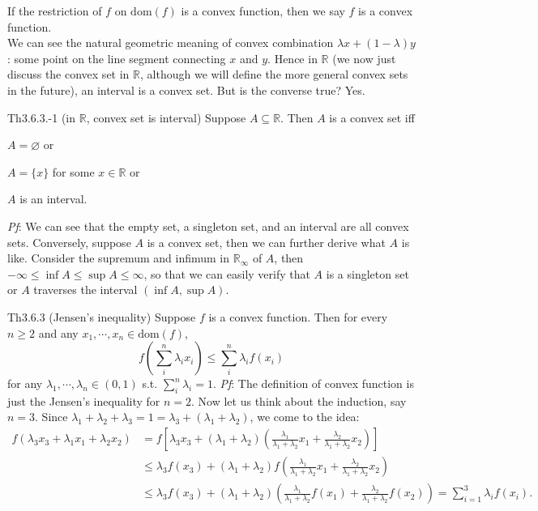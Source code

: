 \documentclass{article}
\begin{document}
\begin{Rmk}{}
    \textcolor{Df}{If the restriction of $f$ on $\text{dom}(f)$ is a convex function, then we say $f$ is a convex function.}\\
    We can see the natural geometric meaning of convex combination $\lambda x+(1-\lambda)y$: some point on the line segment connecting $x$ and $y$. Hence in $\mathbb{R}$ (we now just discuss the convex set in $\mathbb{R}$, although we will define the more general convex sets in the future), an interval is a convex set. But is the converse true? Yes.
\end{Rmk}

\begin{Th}{Th3.6.3.-1 (in $\mathbb{R}$, convex set is interval)}
    Suppose $A\subseteq \mathbb{R}$. Then $A$ is a convex set iff
    \begin{compactenum}
        \item $A=\varnothing$ or
        \item $A=\{x\}$ for some $x\in\mathbb{R}$ or
        \item $A$ is an interval.
    \end{compactenum}
    \tcblower
    \textit{Pf}: We can see that the empty set, a singleton set, and an interval are all convex sets. Conversely, suppose $A$ is a convex set, then we can further derive what $A$ is like. Consider the supremum and infimum in $\mathbb{R}_\infty$ of $A$, then $-\infty\leq\inf A \leq\sup A\leq\infty$, so that we can easily verify that $A$ is a singleton set or $A$ traverses the interval $(\inf A, \sup A)$.
\end{Th}

\begin{Th}{Th3.6.3 (Jensen's inequality)}
    Suppose $f$ is a convex function. Then for every $n\geq 2$ and any $x_1, \cdots, x_n\in\text{dom}(f)$, 
    $$ f\left(\sum_{i}^{n}\lambda_i x_i\right) \leq \sum_{i}^{n}\lambda_i f(x_i) $$
    for any $\lambda_1, \cdots, \lambda_n\in (0,1)$ s.t. $\sum_{i}^{n}\lambda_i = 1$.
    \tcblower
    \textit{Pf}: The definition of convex function is just the Jensen's inequality for $n=2$. Now let us think about the induction, say $n=3$. Since $\lambda_1+\lambda_2+\lambda_3 = 1 = \lambda_3 + (\lambda_1+\lambda_2)$, we come to the idea:
    $$ 
    \begin{aligned}
        f\left(\lambda_3 x_3 + \lambda_1 x_1 + \lambda_2 x_2\right) &= f\left[\lambda_3 x_3 + (\lambda_1 + \lambda_2)\left(\frac{\lambda_1}{\lambda_1+\lambda_2}x_1 + \frac{\lambda_2}{\lambda_1+\lambda_2}x_2\right)\right] \\
        &\leq \lambda_3 f(x_3) + (\lambda_1+\lambda_2)f\left(\frac{\lambda_1}{\lambda_1+\lambda_2}x_1 + \frac{\lambda_2}{\lambda_1+\lambda_2}x_2\right) \\
        &\leq \lambda_3 f(x_3) + (\lambda_1+\lambda_2)\left(\frac{\lambda_1}{\lambda_1+\lambda_2}f(x_1) + \frac{\lambda_2}{\lambda_1+\lambda_2}f(x_2)\right) = \sum_{i=1}^{3}\lambda_i f(x_i).
    \end{aligned} 
    $$
\end{Th}
\end{document}
